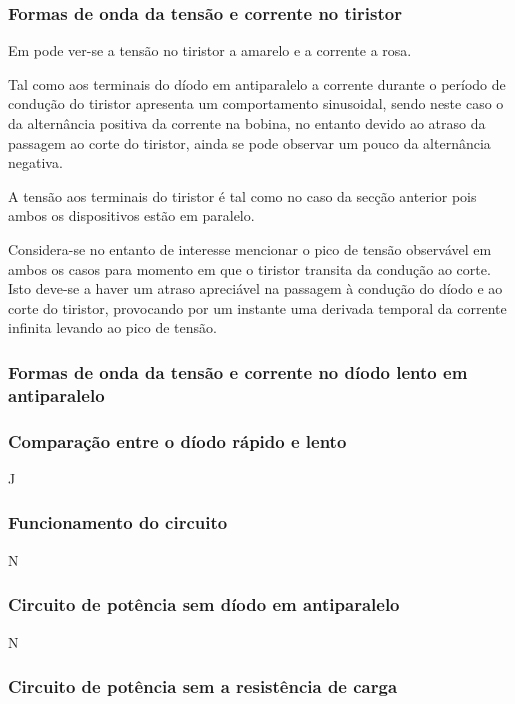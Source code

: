\documentclass[a4paper,11pt]{article}
\numberwithin{equation}{section}
\begin{document}
\subsubsection{Formas de onda da tensão e corrente no tiristor}

Em  pode ver-se a tensão no tiristor a amarelo e a corrente a rosa.

Tal como aos terminais do díodo em antiparalelo a corrente durante o período de condução do tiristor apresenta um comportamento sinusoidal, sendo neste caso o da alternância positiva da corrente na bobina, no entanto devido ao atraso da passagem ao corte do tiristor, ainda se pode observar um pouco da alternância negativa.

A tensão aos terminais do tiristor é tal como no caso da secção anterior pois ambos os dispositivos estão em paralelo.

Considera-se no entanto de interesse mencionar o pico de tensão observável em ambos os casos para momento em que o tiristor transita da condução ao corte. Isto deve-se a haver um atraso apreciável na passagem à condução do díodo e ao corte do tiristor, provocando por um instante uma derivada temporal da corrente infinita levando ao pico de tensão.


\subsubsection{Formas de onda da tensão e corrente no díodo lento em antiparalelo}


\subsubsection{Comparação entre o díodo rápido e lento}

J

\subsubsection{Funcionamento do circuito}

N

\subsubsection{Circuito de potência sem díodo em antiparalelo}

N

\subsubsection{Circuito de potência sem a resistência de carga}
\end{document}
